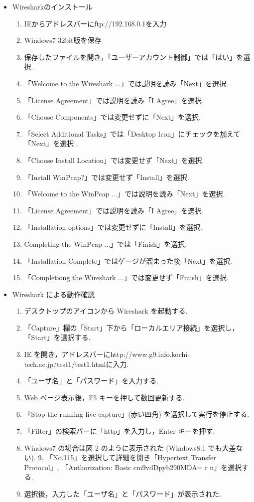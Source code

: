 \documentclass[a4j,titlepage]{jarticle}
\begin{document}
\begin{itemize}
  \item Wiresharkのインストール
\begin{enumerate}
\item IEからアドレスバーにftp://192.168.0.1を入力
\item Windows7 32bit版を保存
  \item 保存したファイルを開き，「ユーザーアカウント制御」では「はい」を選択.

\item 「Welcome to the Wireshark ...」では説明を読み「Next」を選択.
\item「License Agreement」では説明を読み「I Agree」を選択.
\item 「Choose Components」では変更せずに「Next」を選択.
\item 「Select Additional Tasks」では「Desktop Icon」にチェックを加えて「Next」を選択 .
\item 「Choose Install Location」では変更せず「Next」を選択.
\item 「Install WinPcap?」では変更せず「Install」を選択.
\item 「Welcome to the WinPcap ...」では説明を読み「Next」を選択.
\item 「License Agreement」では説明を読み「I Agree」を選択.
\item 「Installation options」では変更せずに「Install」を選択.
\item Completing the WinPcap ...」では「Finish」を選択.
\item 「Installation Complete」ではゲージが溜まった後「Next」を選択.
\item 「Completiong the Wireshark ...」では変更せず「Finish」を選択.
\end{enumerate}
\item Wireshark による動作確認
  \begin{enumerate}
    \item デスクトップのアイコンから Wireshark を起動する.
\item 「Capture」欄の「Start」下から「ローカルエリア接続」を選択し，「Start」を選択する. \item IE を開き，アドレスバーにhttp://www.g9.info.kochi-tech.ac.jp/test1/test1.htmlに入力.
\item 「ユーザ名」と「パスワード」を入力する.
\item  Web ページ表示後，F5 キーを押して数回更新する.
\item 「Stop the running live capture」(赤い四角) を選択して実行を停止する.
\item 「Filter」の検索バーに「http」を入力し，Enter キーを押す.
\item Windows7 の場合は図 2 のように表示された (Windows8.1 でも大差ない). 9. 「No.115」を選択して詳細を開き「Hypertext Transfer Protocol」, 「Authorization: Basic cm9vdDpyb290MDA= r n」を選択する.
\item 選択後，入力した「ユーザ名」と「パスワード」が表示された.
\end{enumerate}
\end{itemize}
\end{document}
